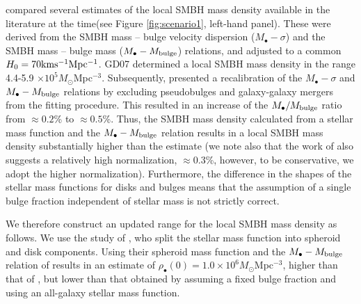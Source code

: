 \documentclass[twocolumn]{aastex631}
\begin{document}
\citet[hereafter GD07]{2007MNRAS.380L..15G} compared several estimates of the local SMBH mass density available in the literature at the time(see Figure \ref{fig:scenario1}, left-hand panel). These were derived from the SMBH mass --  bulge velocity dispersion ($M_{\bullet} -\sigma$) and the SMBH mass -- bulge mass  ($M_{\bullet} - M_{\rm bulge}$) relations, and adjusted to a common $H_0=70 {\rm kms^{-1} Mpc^{-1}}$. GD07 determined a local SMBH mass density in the range 4.4-5.9 $\times 10^5 M_{\odot}$Mpc$^{-3}$. 
Subsequently, \citet{2013ARA&A..51..511K} presented a recalibration of the $M_{\bullet}-\sigma$ and $M_{\bullet}-M_{\rm bulge}$ relations by excluding pseudobulges and galaxy-galaxy mergers from the fitting procedure. This resulted in an increase of the $M_{\bullet}/M_{\rm bulge}$ ratio from $\approx 0.2$\% to $\approx 0.5$\%. Thus, the SMBH mass density calculated from a stellar mass function and the \citet{2013ARA&A..51..511K} $M_{\bullet}-M_{\rm bulge}$ relation results in a local SMBH mass density substantially higher than the \citet{2007MNRAS.380L..15G} estimate (we note also that the work of \citet{2013ApJ...764..184M} also suggests a relatively high normalization, $\approx 0.3$\%, however, to be conservative, we adopt the higher \citet{2013ARA&A..51..511K} normalization). Furthermore, the difference in the shapes of the stellar mass functions for disks and bulges means that the assumption of a single bulge fraction independent of stellar mass is not strictly correct.

We therefore construct an updated range for the local SMBH mass density as follows. We use the study of \citet{2016MNRAS.459...44T}, who split the stellar mass function into spheroid and disk components. Using their spheroid mass function and the $M_{\bullet} - M_{\rm bulge}$ relation of \citet{2013ARA&A..51..511K} results in an estimate of $\rho_{\bullet}(0)=1.0\times 10^6 M_{\odot}$Mpc$^{-3}$, higher than that of
\citet{2007MNRAS.380L..15G}, but lower than that obtained by assuming a fixed bulge fraction and using an all-galaxy stellar mass function.  
\end{document}
